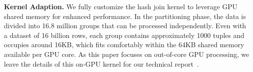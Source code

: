 \begin{comment}
When there are $2N$ chunks of clustered \texttt{key} and \texttt{val} from both tables, there will be $2N$ groups having the same hash, each from a chunk.
We ensure that all groups with the same hash, from both tables, are in the same \texttt{HashJoinExOp}'s partition, and the partition needs to fit the GPU buffer.
To achieve this, we form the partitions based on the $2N$ \texttt{boundary} chunks from both tables.
The sum of \texttt{boundary[i]} from all $2N$ \texttt{boundary} chunks is the number of tuples contained by all groups from 0 to $i$, denoted $N^i$.
We can binary search for a suitable $i_0$ such that all tuples fit the GPU buffer.
All groups with their hashes $h < i_0$ are placed in the first partition. 
Then, we iteratively find $i_k\ (k > 0)$ by binary search $i_k$ such that $N^{i_k} - N^{i_{k-1}}$ is smaller than the GPU buffer size, until $i_k$ equals the maximum number of unique groups ($2^{24}$ in our setting).
All groups with their hashes $i_{k-1} \leq h < i_k$ are placed in the $k$th partition.
Each partition contains all segments of its groups' \texttt{key}, \texttt{val}, and \texttt{boundary} from all the $2N$ chunks.  
Figure~\ref{fig:hash-join-flow} demonstrates an example where the \texttt{RadixPartitionExKer} divides both tables into 2 chunks, and \texttt{HashJoinExKer} regroups them into 4 partitions and processes each independently.
\end{comment}

\noindent
\textbf{Kernel Adaption.}
We fully customize the hash join kernel to leverage GPU shared memory for enhanced performance. 
In the partitioning phase, the data is divided into 16.8 million groups that can be processed independently. 
Even with a dataset of 16 billion rows, each group contains approximately 1000 tuples and occupies around 16KB, which fits comfortably within the 64KB shared memory available per GPU core.
As this paper focuses on out-of-core GPU processing, we leave the details of this on-GPU kernel for our technical report~\cite{vortex-technical-report}.


